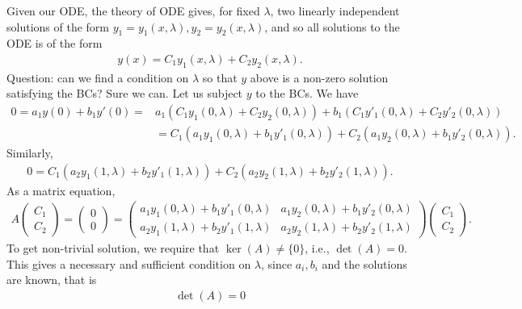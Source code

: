 \documentclass{article}
\theoremstyle{definition}
\begin{document}
Given our ODE, the theory of ODE gives, for fixed $\lambda$, two linearly independent solutions of the form $y_1 = y_1(x,\lambda), y_2 = y_2(x,\lambda)$, and so all solutions to the ODE is of the form
\begin{align*}
y(x) = C_1 y_1(x,\lambda) + C_2y_2(x,\lambda).
\end{align*}
Question: can we find a condition on $\lambda$ so that $y$ above is a non-zero solution satisfying the BCs? Sure we can. Let us subject $y$ to the BCs. We have
\begin{align*}
0 = a_1y(0) + b_1 y'(0) =& a_1(C_1y_1(0,\lambda) + C_2y_2(0,\lambda)) + b_1(C_1y'_1(0,\lambda) + C_2y'_2(0,\lambda))\\
&= C_1(a_1y_1(0,\lambda) + b_1y'_1(0,\lambda)) + C_2(a_1y_2(0,\lambda) + b_1y'_2(0,\lambda)).
\end{align*}
Similarly, 
\begin{align*}
0 = C_1(a_2y_1(1,\lambda) + b_2y'_1(1,\lambda)) + C_2(a_2y_2(1,\lambda) + b_2y'_2(1,\lambda)).
\end{align*}
As a matrix equation,
\begin{align*}
A\begin{pmatrix}
C_1\\C_2
\end{pmatrix}=
\begin{pmatrix}
0\\0
\end{pmatrix}=
\begin{pmatrix}
a_1y_1(0,\lambda) + b_1y'_1(0,\lambda) & a_1y_2(0,\lambda) + b_1 y'_2(0,\lambda)\\
a_2y_1(1,\lambda) + b_2y'_1(1,\lambda) & a_2y_2(1,\lambda) + b_2y'_2(1,\lambda)
\end{pmatrix}
\begin{pmatrix}
C_1\\C_2
\end{pmatrix}.
\end{align*}
To get non-trivial solution, we require that $\ker(A)\neq \{ 0\}$, i.e., $\det(A) = 0$. This gives a necessary and sufficient condition on $\lambda$, since $a_i,b_i$ and the solutions are known, that is
\begin{align*}
\boxed{\det(A)=0}
\end{align*}
\end{document}
